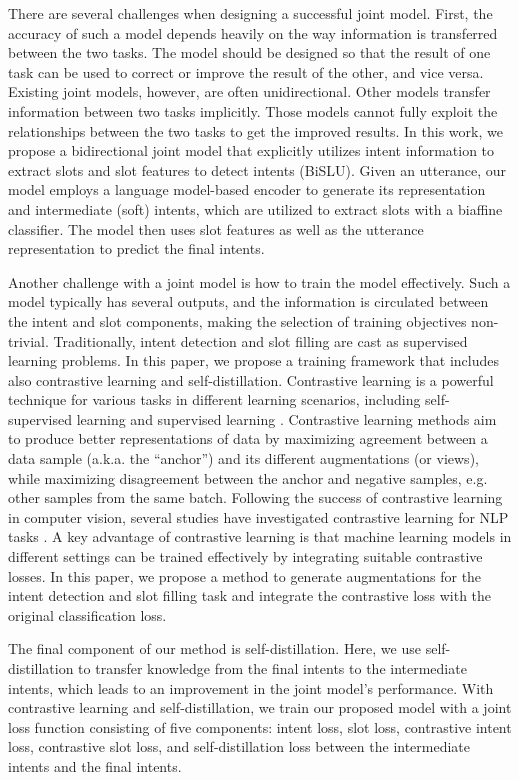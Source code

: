 \documentclass{ecai}
\begin{document}
There are several challenges when designing a successful joint model. First, the accuracy of such a model depends heavily on the way information is transferred between the two tasks. The model should be designed so that the result of one task can be used to correct or improve the result of the other, and vice versa. Existing joint models, however, are often unidirectional. Other models transfer information between two tasks implicitly. Those models cannot fully exploit the relationships between the two tasks to get the improved results. In this work, we propose a bidirectional joint model that explicitly utilizes intent information to extract slots and slot features to detect intents (BiSLU). Given an utterance, our model employs a language model-based encoder to generate its representation and intermediate (soft) intents, which are utilized to extract slots with a biaffine classifier. The model then uses slot features as well as the utterance representation to predict the final intents. 

Another challenge with a joint model is how to train the model effectively. Such a model typically has several outputs, and the information is circulated between the intent and slot components, making the selection of training objectives non-trivial. Traditionally, intent detection and slot filling are cast as supervised learning problems. In this paper, we propose a training framework that includes also contrastive learning and self-distillation. Contrastive learning is a powerful technique for various tasks in different learning scenarios, including self-supervised learning and supervised learning \cite{chen:2020,He:2020,khosla:2020,zhang:2022}. Contrastive learning methods aim to produce better representations of data by maximizing agreement between a data sample (a.k.a. the ``anchor'') and its different augmentations (or views), while maximizing disagreement between the anchor and negative samples, e.g. other samples from the same batch. Following the success of contrastive learning in computer vision, several studies have investigated contrastive learning for NLP tasks \cite{gunel:2021,Rethmeier:2023,ZhangNAACL:2022}. A key advantage of contrastive learning is that machine learning models in different settings can be trained effectively by integrating suitable contrastive losses. In this paper, we propose a method to generate augmentations for the intent detection and slot filling task and integrate the contrastive loss with the original classification loss. 

The final component of our method is self-distillation. Here, we use self-distillation to transfer knowledge from the final intents to the intermediate intents, which leads to an improvement in the joint model’s performance. With contrastive learning and self-distillation, we train our proposed model with a joint loss function consisting of five components: intent loss, slot loss, contrastive intent loss, contrastive slot loss, and self-distillation loss between the intermediate intents and the final intents. 
\end{document}
